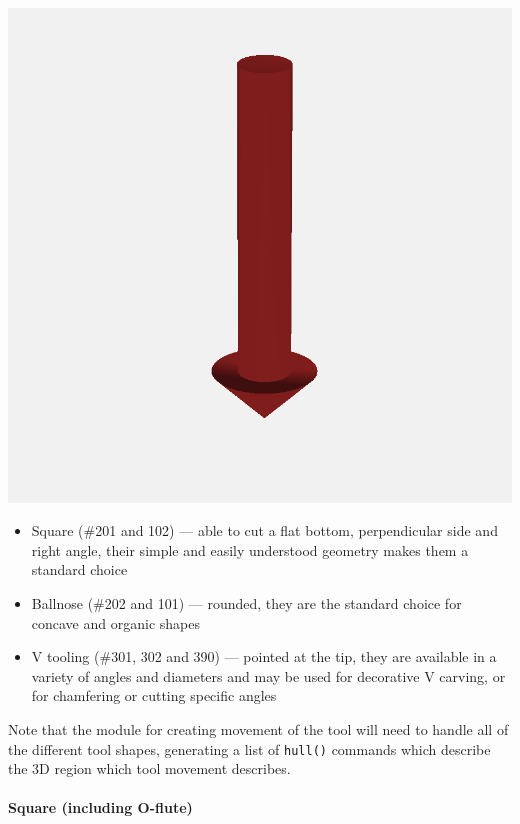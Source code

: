 \documentclass{ltxdoc}
\begin{document}
\begin{samepage}
           \includegraphics[width=\linewidth/3]{images/tool_V_301.png}%

\begin{itemize}
\item Square (\#201 and 102) --- able to cut a flat bottom, perpendicular side and
                                 right angle, their simple and easily understood 
                                 geometry makes them a standard choice 
\item Ballnose (\#202 and 101) --- rounded, they are the standard choice for concave
                                   and organic shapes
\item V tooling (\#301, 302 and 390) --- pointed at the tip, they are available in a
                                         variety of angles and diameters and may be
                                         used for decorative V carving, or for
                                         chamfering or cutting specific angles
\end{itemize}
\end{samepage}

Note that the module for creating movement of the tool will need to handle all of the different tool shapes, generating a list of \verb|hull()| commands which describe the 3D region which tool movement describes.

\paragraph{Square (including O-flute)}
\end{document}
